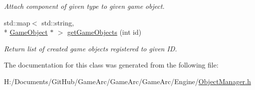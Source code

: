 \begin{DoxyCompactItemize}
\begin{DoxyCompactList}\small\item\em Attach component of given type to given game object. \end{DoxyCompactList}\item 
\hypertarget{class_object_manager_ae3e3f513abd9674f2b455f161ad0fb6d}{std\+::map$<$ std\+::string, \\*
\hyperlink{class_game_object}{Game\+Object} $\ast$ $>$ \hyperlink{class_object_manager_ae3e3f513abd9674f2b455f161ad0fb6d}{get\+Game\+Objects} (int id)}\label{class_object_manager_ae3e3f513abd9674f2b455f161ad0fb6d}

\begin{DoxyCompactList}\small\item\em Return list of created game objects registered to given I\+D. \end{DoxyCompactList}\end{DoxyCompactItemize}


The documentation for this class was generated from the following file\+:\begin{DoxyCompactItemize}
\item 
H\+:/\+Documents/\+Git\+Hub/\+Game\+Arc/\+Game\+Arc/\+Game\+Arc/\+Engine/\hyperlink{_object_manager_8h}{Object\+Manager.\+h}\end{DoxyCompactItemize}
